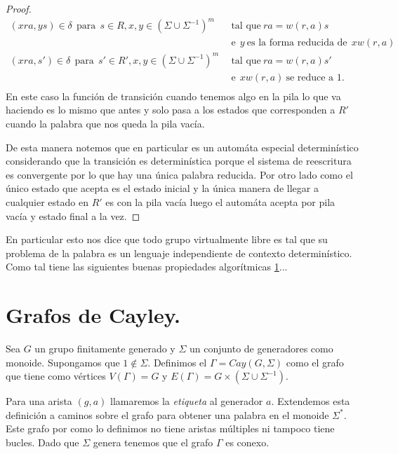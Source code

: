 \documentclass[tesis.tex]{subfiles}
\newcommand{\fg}{grupo finitamente generado }
\begin{document}
\begin{proof}
	\begin{align*}
	(xra,ys) \in \delta \ \ \text{para} \ \  s \in R, x,y \in (\Sigma \cup \Sigma^{-1})^m & \ \  \text{tal que} \ ra=w(r,a)s  \\ & \ \ \text{e} \ \ y \ \text{es la forma reducida de} \ \ xw(r,a)  \\
	(xra,s') \in \delta\ \ \text{para} \ \  s' \in R', x,y \in (\Sigma \cup \Sigma^{-1})^m & \ \  \text{tal que} \ ra=w(r,a)s'  \\ & \ \ \text{e}  \ \ xw(r,a)  \ \text{se reduce a 1}. \ \  \\ 
	\end{align*}
	En este caso la función de transición cuando tenemos algo en la pila lo que va haciendo es lo mismo que antes y solo pasa a los estados que corresponden a $R'$ cuando la palabra que nos queda la pila vacía. 
	
	De esta manera notemos que en particular es un automáta especial determinístico considerando que la transición es determinística porque el sistema de reescritura es convergente por lo que hay una única palabra reducida. 
	Por otro lado como el único estado que acepta es el estado inicial y la única manera de llegar a cualquier estado en $R'$ es con la pila vacía luego el automáta acepta por pila vacía y estado final a la vez.
\end{proof}

\begin{obs}
	En particular esto nos dice que todo grupo virtualmente libre es tal que su problema de la palabra es un lenguaje independiente de contexto determinístico. 
	Como tal tiene las siguientes buenas propiedades algorítmicas \ref{}...
\end{obs}

\newpage

\section{Grafos de Cayley.}

\begin{deff}
	Sea $G$ un \fg y $\Sigma$ un conjunto de generadores como monoide. 
	Supongamos que $1 \notin \Sigma$.
	Definimos el  $\Gamma = Cay(G,\Sigma)$ como el grafo que tiene como vértices $V(\Gamma) = G$ y $E(\Gamma) = G \times (\Sigma \cup \Sigma^{-1})$. 
\end{deff}

Para una arista $(g,a)$ llamaremos la \emph{etiqueta} al generador $a$.
Extendemos esta definición a caminos sobre el grafo para obtener una palabra en el monoide $\Sigma^*$.
Este grafo por como lo definimos no tiene aristas múltiples ni tampoco tiene bucles.
Dado que $\Sigma$ genera tenemos que el grafo $\Gamma$ es conexo.
\end{document}
